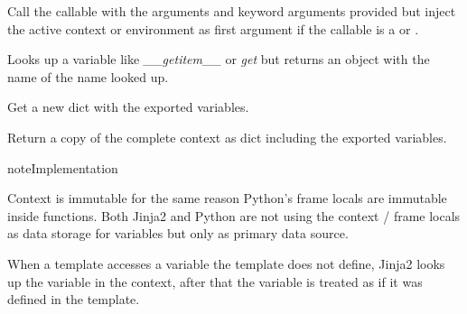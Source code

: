 \documentclass[a4paper,10pt,english]{sphinxmanual}
\begin{document}
\begin{fulllineitems}

\begin{fulllineitems}
\label{api:jinja2.runtime.Context.call}
Call the callable with the arguments and keyword arguments
provided but inject the active context or environment as first
argument if the callable is a {\hyperref[api:jinja2.contextfunction]{}} or
{\hyperref[api:jinja2.environmentfunction]{}}.

\end{fulllineitems}


\begin{fulllineitems}
\label{api:jinja2.runtime.Context.resolve}
Looks up a variable like \emph{\_\_getitem\_\_} or \emph{get} but returns an
{\hyperref[api:jinja2.Undefined]{}} object with the name of the name looked up.

\end{fulllineitems}


\begin{fulllineitems}
\label{api:jinja2.runtime.Context.get_exported}
Get a new dict with the exported variables.

\end{fulllineitems}


\begin{fulllineitems}
\label{api:jinja2.runtime.Context.get_all}
Return a copy of the complete context as dict including the
exported variables.

\end{fulllineitems}


\end{fulllineitems}


\begin{notice}{note}{Implementation}

Context is immutable for the same reason Python's frame locals are
immutable inside functions.  Both Jinja2 and Python are not using the
context / frame locals as data storage for variables but only as primary
data source.

When a template accesses a variable the template does not define, Jinja2
looks up the variable in the context, after that the variable is treated
as if it was defined in the template.
\end{notice}
\end{document}
